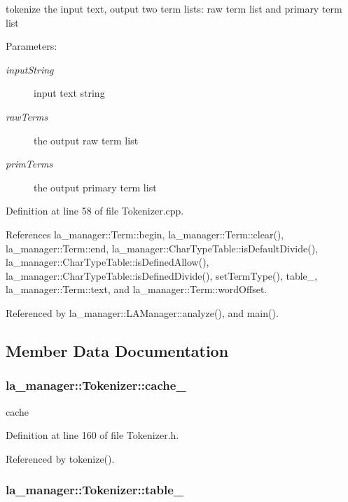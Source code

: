 tokenize the input text, output two term lists: raw term list and primary term list 

\begin{Desc}
\item[Parameters:]
\begin{description}
\item[{\em inputString}]input text string \item[{\em rawTerms}]the output raw term list \item[{\em primTerms}]the output primary term list \end{description}
\end{Desc}


Definition at line 58 of file Tokenizer.cpp.

References la\_\-manager::Term::begin, la\_\-manager::Term::clear(), la\_\-manager::Term::end, la\_\-manager::CharTypeTable::isDefaultDivide(), la\_\-manager::CharTypeTable::isDefinedAllow(), la\_\-manager::CharTypeTable::isDefinedDivide(), setTermType(), table\_\-, la\_\-manager::Term::text, and la\_\-manager::Term::wordOffset.

Referenced by la\_\-manager::LAManager::analyze(), and main().

\subsection{Member Data Documentation}
\hypertarget{classla__manager_1_1Tokenizer_f1f7c6216c8af54190627b27d2090e48}{
\subsubsection[{cache\_\-}]{ {\bf la\_\-manager::Tokenizer::cache\_\-}}}
\label{classla__manager_1_1Tokenizer_f1f7c6216c8af54190627b27d2090e48}


cache 



Definition at line 160 of file Tokenizer.h.

Referenced by tokenize().\hypertarget{classla__manager_1_1Tokenizer_6f4cf5fcbd2505e9258f9e570b7e4ce0}{
\subsubsection[{table\_\-}]{ {\bf la\_\-manager::Tokenizer::table\_\-}}}
\label{classla__manager_1_1Tokenizer_6f4cf5fcbd2505e9258f9e570b7e4ce0}


